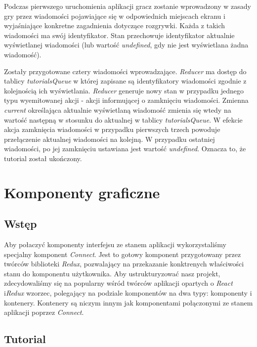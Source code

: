 \documentclass[12pt,a4paper,polish,thesis]{dcsbook}
\begin{document}
{	Podczas pierwszego uruchomienia aplikacji gracz zostanie wprowadzony w zasady gry przez wiadomości pojawiające się w odpowiednich miejscach ekranu i wyjaśniające konkretne zagadnienia dotyczące rozgrywki. Każda z takich wiadomości ma swój identyfikator. Stan przechowuje identyfikator aktualnie wyświetlanej wiadomości (lub wartość \textit{undefined}, gdy nie jest wyświetlana żadna wiadomość).
	
	Zostały przygotowane cztery wiadomości wprowadzające. \textit{Reducer} ma dostęp do tablicy \textit{tutorialsQueue} w której zapisane są identyfikatory wiadomości zgodnie z kolejnością ich wyświetlania. \textit{Reducer} generuje nowy stan w przypadku jednego typu wyemitowanej akcji - akcji informującej o zamknięciu wiadomości. Zmienna \textit{current} określająca aktualnie wyświetlaną wiadomość zmienia się wtedy na wartość następną w stosunku do aktualnej w tablicy \textit{tutorialsQueue}. W efekcie akcja zamknięcia wiadomości w przypadku pierwszych trzech powoduje przełączenie aktualnej wiadomości na kolejną. W przypadku ostatniej wiadomości, po jej zamknięciu ustawiana jest wartość \textit{undefined}. Oznacza to, że tutorial został ukończony.
	
	\section{Komponenty graficzne}
	
	\subsection{Wstęp}
	
	Aby połaczyć komponenty interfejsu ze stanem aplikacji wykorzystaliśmy specjalny komponent \textit{Connect}. Jest to gotowy komponent przygotowany przez twórców biblioteki \textit{Redux}, pozwalający na przekazanie konktrenych właściwości stanu do komponentu użytkownika. Aby ustrukturyzować nasz projekt, zdecydowaliśmy się na popularny wśród twórców aplikacji opartych o \textit{React} i\textit{Redux} wzorzec, polegający na podziale komponentów na dwa typy: komponenty i kontenery. Kontenery są niczym innym jak komponentami połączonymi ze stanem aplikacji poprzez \textit{Connect}.
	
	\subsection{Tutorial}
	
}
\end{document}
